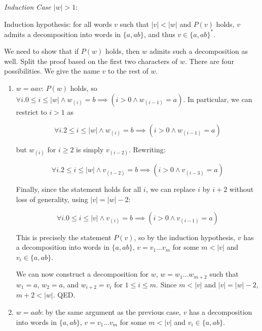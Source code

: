 \begin{exercise}{}
\begin{solution}
    \noindent
    \textit{Induction Case \(|w| > 1\)}: 

    Induction hypothesis: for all words \(v\) such that \(|v| < |w|\) and
    \(P(v)\) holds, \(v\) admits a decomposition into words in \(\{a, ab\}\),
    and thus \(v \in \{a, ab\}^*\).

    We need to show that if \(P(w)\) holds, then \(w\) admits such a
    decomposition as well. Split the proof based on the first two characters of
    \(w\). There are four possibilities. We give the name \(v\) to the rest of
    \(w\).

    \begin{enumerate}
      \item \(w = aav\): \(P(w)\) holds, so \(\forall i. 0 \le i \le |w| \land
      w_{(i)} = b \implies (i > 0 \land w_{(i - 1)} = a)\). In particular, we
      can restrict to \(i > 1\) as

      \begin{equation*}
        \forall i. 2 \le i \le |w| \land w_{(i)} = b \implies (i > 0 \land w_{(i - 1)} = a)
      \end{equation*}

      but \(w_{(i)}\) for \(i \geq 2\) is simply \(v_{(i - 2)}\). Rewriting:

      \begin{equation*}
        \forall i. 2 \le i \le |w| \land v_{(i - 2)} = b \implies (i > 0 \land v_{(i - 3)} = a)
      \end{equation*}

      Finally, since the statement holds for all \(i\), we can replace \(i\) by
      \(i + 2\) without loss of generality, using \(|v| = |w| - 2\):

      \begin{equation*}
        \forall i. 0 \le i \le |v| \land v_{(i)} = b \implies (i > 0 \land v_{(i - 1)} = a)
      \end{equation*}

      This is precisely the statement \(P(v)\), so by the induction hypothesis,
      \(v\) has a decomposition into words in \(\{a, ab\}\), \(v = v_1\ldots
      v_m\) for some \(m < |v|\) and \(v_i \in \{a, ab\}\).

      We can now construct a decomposition for \(w\), \(w = w_1\ldots w_{m+2}\)
      such that \(w_1 = a\), \(w_2 = a\), and \(w_{i + 2} = v_i\) for \(1 \le i
      \le m\). Since \(m < |v|\) and \(|v| = |w| - 2\), \(m + 2 < |w|\). QED.

      \item \(w = aab\): by the same argument as the previous case, \(v\) has a decomposition
      into words in \(\{a, ab\}\), \(v = v_1\ldots v_m\) for some \(m < |v|\)
      and \(v_i \in \{a, ab\}\). 
      

\end{enumerate}
\end{solution}
\end{exercise}
